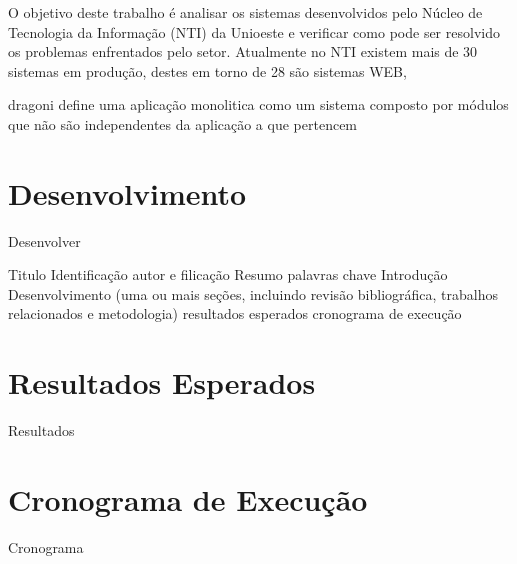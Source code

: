 \documentclass[12pt]{article}
\begin{document}
O objetivo deste trabalho é analisar os sistemas desenvolvidos pelo Núcleo de Tecnologia da Informação (NTI) da Unioeste e verificar como pode ser resolvido os problemas enfrentados pelo setor. Atualmente no NTI existem mais de 30 sistemas em produção, destes em torno de 28 são sistemas WEB, 


dragoni define uma aplicação monolitica como um sistema composto por módulos que não são independentes da aplicação a que pertencem



\section{Desenvolvimento} \label{sec:firstpage}

Desenvolver

Titulo
Identificação autor e filicação
Resumo
palavras chave
Introdução
Desenvolvimento (uma ou mais seções, incluindo revisão bibliográfica, trabalhos relacionados e metodologia)
resultados esperados
cronograma de execução

\section{Resultados Esperados}

Resultados

\section{Cronograma de Execução}

Cronograma





\end{document}
